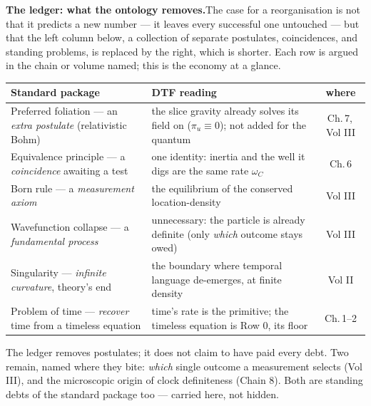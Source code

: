 \documentclass[11pt]{article}
\begin{document}
\begin{tcolorbox}
\textbf{The ledger: what the ontology removes.}\enspace The case for a reorganisation is not that it
predicts a new number --- it leaves every successful one untouched --- but that the left column below,
a collection of separate postulates, coincidences, and standing problems, is replaced by the right,
which is shorter. Each row is argued in the chain or volume named; this is the economy at a glance.
\smallskip
\begin{center}\small\renewcommand{\arraystretch}{1.25}
\begin{tabular}{@{}>{\raggedright\arraybackslash}p{5.0cm}>{\raggedright\arraybackslash}p{8.4cm}c@{}}
\toprule
\textbf{Standard package} & \textbf{DTF reading} & \textbf{where}\\
\midrule
Preferred foliation --- an \emph{extra postulate} (relativistic Bohm) & the slice gravity already solves
its field on ($\pi_u\equiv0$); not added for the quantum & Ch.\,7,\,Vol III\\
Equivalence principle --- a \emph{coincidence} awaiting a test & one identity: inertia and the well it
digs are the same rate $\omega_C$ & Ch.\,6\\
Born rule --- a \emph{measurement axiom} & the equilibrium of the conserved location-density & Vol III\\
Wavefunction collapse --- a \emph{fundamental process} & unnecessary: the particle is already definite
(only \emph{which} outcome stays owed) & Vol III\\
Singularity --- \emph{infinite curvature}, theory's end & the boundary where temporal language
de-emerges, at finite density & Vol II\\
Problem of time --- \emph{recover} time from a timeless equation & time's rate is the primitive; the
timeless equation is Row 0, its floor & Ch.\,1--2\\
\bottomrule
\end{tabular}
\end{center}
\smallskip
\noindent The ledger removes postulates; it does not claim to have paid every debt. Two remain, named
where they bite: \emph{which} single outcome a measurement selects (Vol III), and the microscopic origin
of clock definiteness (Chain 8). Both are standing debts of the standard package too --- carried here,
not hidden.
\end{tcolorbox}

\bigskip
\end{document}
